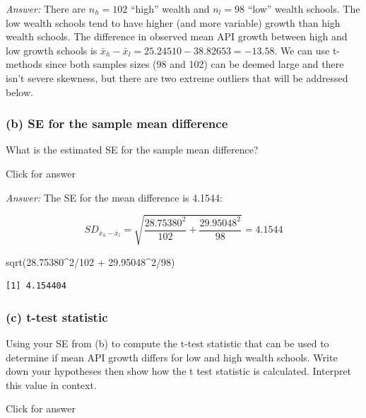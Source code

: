 \documentclass[
]{book}
\newenvironment{Shaded}{\begin{snugshade}}{\end{snugshade}}
\newcommand{\DecValTok}[1]{\textcolor[rgb]{0.00,0.00,0.81}{#1}}
\newcommand{\FloatTok}[1]{\textcolor[rgb]{0.00,0.00,0.81}{#1}}
\newcommand{\FunctionTok}[1]{\textcolor[rgb]{0.00,0.00,0.00}{#1}}
\newcommand{\NormalTok}[1]{#1}
\newcommand{\SpecialCharTok}[1]{\textcolor[rgb]{0.00,0.00,0.00}{#1}}
\begin{document}
\emph{Answer:} There are \(n_h = 102\) ``high'' wealth and \(n_l = 98\) ``low'' wealth schools. The low wealth schools tend to have higher (and more variable) growth than high wealth schools. The difference in observed mean API growth between high and low growth schools is \(\bar{x}_h - \bar{x}_l = 25.24510 - 38.82653 = -13.58\). We can use t-methods since both samples sizes (98 and 102) can be deemed large and there isn't severe skewness, but there are two extreme outliers that will be addressed below.

\hypertarget{b-se-for-the-sample-mean-difference}{%
\subsubsection{(b) SE for the sample mean difference}\label{b-se-for-the-sample-mean-difference}}

What is the estimated SE for the sample mean difference?

Click for answer

\emph{Answer:} The SE for the mean difference is 4.1544:

\[
SD_{\bar{x}_h - \bar{x}_l} = \sqrt{\dfrac{28.75380^2}{102} + \dfrac{29.95048^2}{98}} = 4.1544
\]

\begin{Shaded}
\begin{Highlighting}[]
\FunctionTok{sqrt}\NormalTok{(}\FloatTok{28.75380}\SpecialCharTok{\^{}}\DecValTok{2}\SpecialCharTok{/}\DecValTok{102} \SpecialCharTok{+}  \FloatTok{29.95048}\SpecialCharTok{\^{}}\DecValTok{2}\SpecialCharTok{/}\DecValTok{98}\NormalTok{)}
\end{Highlighting}
\end{Shaded}

\begin{verbatim}
[1] 4.154404
\end{verbatim}

\hypertarget{c-t-test-statistic-2}{%
\subsubsection{(c) t-test statistic}\label{c-t-test-statistic-2}}

Using your SE from (b) to compute the t-test statistic that can be used to determine if mean API growth differs for low and high wealth schools. Write down your hypotheses then show how the t test statistic is calculated. Interpret this value in context.

Click for answer
\end{document}
